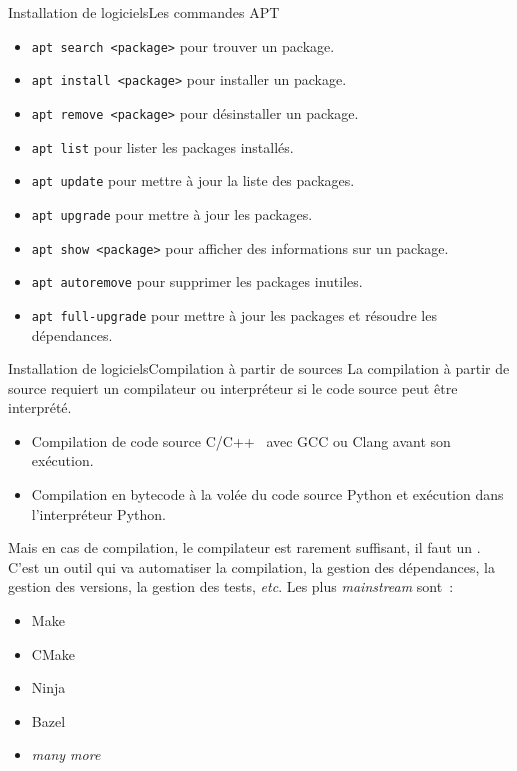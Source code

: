 \documentclass{beamer}
\begin{document}
    \begin{frame}{Installation de logiciels}{Les commandes APT}
        \begin{itemize}
            \item \lstinline{apt search <package>} pour trouver un package.
            \item \lstinline{apt install <package>} pour installer un package.
            \item \lstinline{apt remove <package>} pour désinstaller un package.
            \item \lstinline{apt list} pour lister les packages installés.
            \item \lstinline{apt update} pour mettre à jour la liste des packages.
            \item \lstinline{apt upgrade} pour mettre à jour les packages.
            \item \lstinline{apt show <package>} pour afficher des informations sur un package.
            \item \lstinline{apt autoremove} pour supprimer les packages inutiles.
            \item \lstinline{apt full-upgrade} pour mettre à jour les packages et résoudre les dépendances.
        \end{itemize}
    \end{frame}

    \begin{frame}{Installation de logiciels}{Compilation à partir de sources}
        La compilation à partir de source requiert un compilateur ou interpréteur si le code source peut être interprété.
        \bigbreak
        \begin{itemize}
            \item Compilation de code source C/C++~ avec GCC ou Clang avant son exécution.
            \item Compilation en bytecode à la volée du code source Python et exécution dans l'interpréteur Python.
        \end{itemize}
        Mais en cas de compilation, le compilateur est rarement suffisant, il faut un .
        C'est un outil qui va automatiser la compilation, la gestion des dépendances, la gestion des versions, la gestion des tests, \textit{etc}.
        Les plus \textit{mainstream} sont~:
        \begin{itemize}
            \item Make
            \item CMake
            \item Ninja
            \item Bazel
            \item \textit{many more}
        \end{itemize}
    \end{frame}
\end{document}
